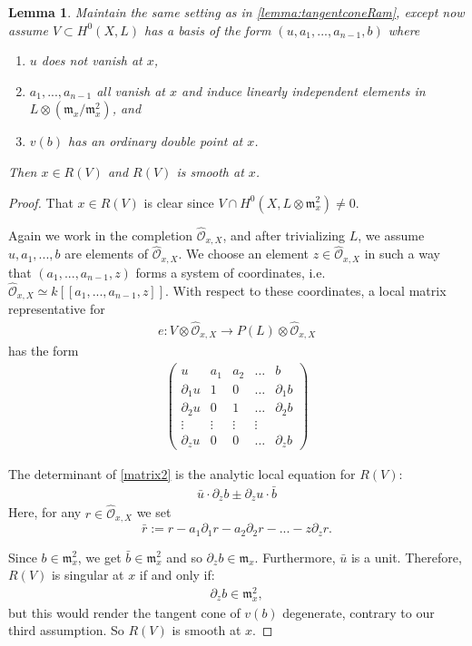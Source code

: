 \documentclass[11pt,reqno]{amsart}
\theoremstyle{plain}
\newtheorem{lemma}[theorem]{Lemma}
\theoremstyle{definition}
\theoremstyle{remark}
\numberwithin{equation}{section}
\newcommand{\cO}{{\mathcal O}}
\renewcommand{\to}{{\longrightarrow}}
\numberwithin{equation}{section}
\begin{document}
\begin{lemma}\label{lemma:basepointfree}
  Maintain the same setting as in \autoref{lemma:tangentconeRam}, except now assume $V \subset H^{0}(X,L)$ has a basis of the form $(u,a_{1}, ..., a_{n-1}, b)$ where 
  \begin{enumerate}
    \item $u$ does not vanish at $x$,
    \item $a_{1}, ..., a_{n-1}$ all vanish at $x$ and induce linearly independent elements in $L \otimes ({\mathfrak m}_{x}/{\mathfrak m}^{2}_{x})$, and
    \item $v(b)$ has an ordinary double point at $x$. 
  \end{enumerate}
  Then $x \in R(V)$ and $R(V)$ is smooth at $x$.
\end{lemma}

\begin{proof}
  That $x \in R(V)$ is clear since $V \cap H^{0}(X,L \otimes \mathfrak{m}^{2}_{x}) \neq 0 $.

  Again we work in the completion $\widehat{\cO}_{x,X}$, and after trivializing $L$, we assume $u, a_{1}, ..., b$ are elements of $\widehat{\cO}_{x,X}$. We choose an element $z \in \widehat{\cO}_{x,X}$ in such a way that $(a_{1}, ..., a_{n-1}, z)$ forms a system of coordinates, i.e. $\widehat{\cO}_{x,X} \simeq k[[a_{1}, ..., a_{n-1}, z ]]$.  With respect to these coordinates, a local matrix representative for \begin{align*}
  e: V \otimes \widehat{\cO}_{x,X} \to P(L) \otimes \widehat{\cO}_{x,X}
\end{align*}
has the form
\begin{align}\label{matrix2}
\begin{pmatrix}
  u & a_{1} & a_{2} & \dots & b \\
  \partial_{1}u & 1 & 0 & \dots & \partial_{1}b \\
  \partial_{2}u & 0 & 1 & \dots & \partial_{2}b \\
  \vdots & \vdots & \vdots & \vdots \\
  \partial_{z}u  & 0 & 0 & \dots & \partial_{z}b
\end{pmatrix}
\end{align}

The determinant of \ref{matrix2} is the analytic local equation for $R(V)$: 
\begin{align*}
   \bar{u} \cdot \partial_{z}b \pm \partial_{z}u \cdot \bar{b}
 \end{align*} 
 Here, for any $r \in \widehat{\cO}_{x,X}$ we set $$\bar{r} := r - a_{1}\partial_{1}r - a_{2}\partial_{2}r - ... - z \partial_{z} r.$$

 Since $b \in {\mathfrak m}^{2}_{x}$, we get $\bar{b} \in {\mathfrak m}^{2}_{x}$ and so $\partial_{z}b \in {\mathfrak m}_{x}$.  Furthermore, $\bar{u}$ is a unit.  Therefore,  $R(V)$ is singular at $x$ if and only if: 
 \begin{align*}
  \partial_{z}b \in {\mathfrak m}^{2}_{x},
 \end{align*}
 but this would render the tangent cone of $v(b)$ degenerate, contrary to our third assumption. So $R(V)$ is smooth at $x$.
\end{proof}
\end{document}
